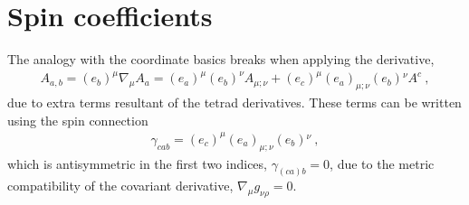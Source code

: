 \section{Spin coefficients}

The analogy with the coordinate basics breaks when applying the derivative, 
\begin{align}
    A_{a,b} = (e_b)^\mu \nabla_\mu A_{a} = (e_a)^\mu (e_b)^\nu A_{\mu ; \nu} + (e_c)^\mu (e_a)_{\mu;\nu} (e_b){}^\nu A^c ~,
\end{align}
due to extra terms resultant of the tetrad derivatives. These terms can be written using the spin connection
\begin{align}
    \gamma_{cab} = (e_c)^\mu (e_a)_{\mu;\nu} (e_b){}^\nu ~,
\end{align}  
which is antisymmetric in the first two indices, $\gamma_{(ca)b}=0$, due to the metric compatibility of the covariant derivative, $\nabla_\mu g_{\nu\rho} = 0$. 